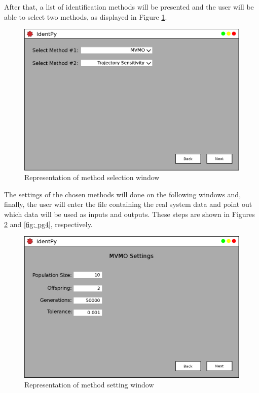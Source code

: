 After that, a list of identification methods will be presented and the user will be able to select two methods, as displayed in Figure \ref{fig: pg2}.

\begin{figure}[h]
	\caption{Representation of method selection window}
	\begin{center}
		\includegraphics[scale=.5]{Images/Software_pg2.eps}
	\end{center}
	\label{fig: pg2}
\end{figure}


The settings of the chosen methods will done on the following windows and, finally, the user will enter the file containing the real system data and point out which data will be used as inputs and outputs. These steps are shown in Figures \ref{fig: pg3} and \ref{fig: pg4}, respectively.

\begin{figure}[h]
	\caption{Representation of method setting window}
	\begin{center}
		\includegraphics[scale=.5]{Images/Software_pg3.eps}
	\end{center}
	\label{fig: pg3}
\end{figure}

